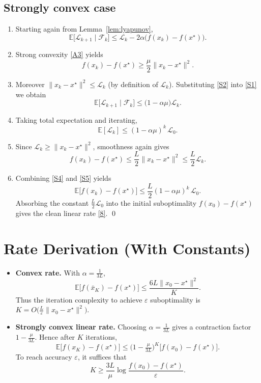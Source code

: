 \documentclass{article}
\newcommand{\E}{\mathbb{E}}
\begin{document}
\subsection*{Strongly convex case}
\begin{enumerate}
\item Starting again from Lemma~\ref{lem:lyapunov},
\[
\E\!\bigl[\mathcal{L}_{k+1}\mid\mathcal{F}_k\bigr]
\le \mathcal{L}_k-2\alpha\bigl(f(x_k)-f(x^\star)\bigr).
\tag{S1}
\]
\item Strong convexity \eqref{A3} yields
\[
f(x_k)-f(x^\star)\ge \frac{\mu}{2}\|x_k-x^\star\|^2 .
\tag{S2}
\]
\item Moreover $\|x_k-x^\star\|^2\le \mathcal{L}_k$ (by definition of $\mathcal{L}_k$). Substituting \eqref{S2} into \eqref{S1} we obtain
\[
\E\!\bigl[\mathcal{L}_{k+1}\mid\mathcal{F}_k\bigr]
\le \bigl(1-\alpha\mu\bigr)\mathcal{L}_k .
\tag{S3}
\]
\item Taking total expectation and iterating,
\[
\E[\mathcal{L}_k]\le (1-\alpha\mu)^{k}\,\mathcal{L}_0 .
\tag{S4}
\]
\item Since $\mathcal{L}_k\ge \|x_k-x^\star\|^2$, smoothness again gives
\[
f(x_k)-f(x^\star)\le \frac{L}{2}\|x_k-x^\star\|^2\le \frac{L}{2}\mathcal{L}_k .
\tag{S5}
\]
\item Combining \eqref{S4} and \eqref{S5} yields
\[
\E\!\bigl[f(x_k)-f(x^\star)\bigr]
\le \frac{L}{2}(1-\alpha\mu)^{k}\,\mathcal{L}_0 .
\tag{S6}
\]
Absorbing the constant $\frac{L}{2}\mathcal{L}_0$ into the initial suboptimality $f(x_0)-f(x^\star)$ gives the clean linear rate \eqref{8}. \qed
\end{enumerate}

\section*{Rate Derivation (With Constants)}
\begin{itemize}
\item \textbf{Convex rate.} With $\alpha = \frac{1}{3L}$,
\[
\E\!\bigl[f(\bar x_K)-f(x^\star)\bigr]
\le \frac{6L\|x_0-x^\star\|^2}{K}.
\tag{R1}
\]
Thus the iteration complexity to achieve $\varepsilon$ suboptimality is $K = O\!\bigl(\frac{L}{\varepsilon}\|x_0-x^\star\|^2\bigr)$.

\item \textbf{Strongly convex linear rate.} Choosing $\alpha = \frac{1}{3L}$ gives a contraction factor $1-\frac{\mu}{3L}$. Hence after $K$ iterations,
\[
\E\!\bigl[f(x_K)-f(x^\star)\bigr]\le
\bigl(1-\tfrac{\mu}{3L}\bigr)^{K}\bigl[f(x_0)-f(x^\star)\bigr].
\tag{R2}
\]
To reach accuracy $\varepsilon$, it suffices that
\[
K\ge \frac{3L}{\mu}\log\frac{f(x_0)-f(x^\star)}{\varepsilon}.
\]
\end{itemize}
\end{document}
